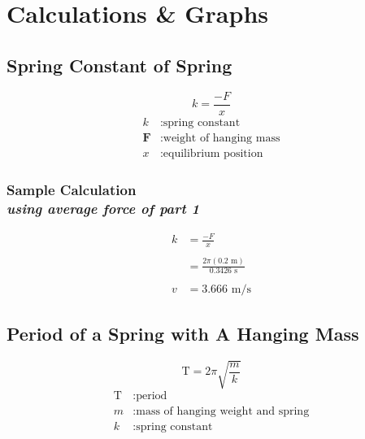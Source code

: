 
\section{Calculations \& Graphs}

\vspace{-0.5cm}
\singlespacing


\subsection{Spring Constant of Spring} 

{\centering
\begin{equation}
	k =  \frac{-F}{x} 
	\label{eq:springK}
\end{equation}
\begin{align*}
	k &: \text{spring constant} \\
	\mathbf{F} &: \text{weight of hanging mass} \\
	x &: \text{equilibrium position}
\end{align*}}

\subsubsection{Sample Calculation \\ {\normalfont \small\textit{using average force of part 1}}}

{\centering
\begin{align*}
	k &=  \frac{-F}{x} \\ \\
		&=  \frac{2 \pi (0.2\text{ m})}{0.3426\text{ s}} \\ \\
	v	&= \boxed{3.666 \text{ m/s}} 
\end{align*}}


\subsection{Period of a Spring with A Hanging Mass} 

{\centering
\begin{equation}
	\text{T} = 2\pi \sqrt{\frac{m}{k}}
	\label{eq:springMass}
\end{equation}
\begin{align*}
	\text{T} &: \text{period} \\
	m &: \text{mass of hanging weight and spring} \\
	k &: \text{spring constant}
\end{align*}}

